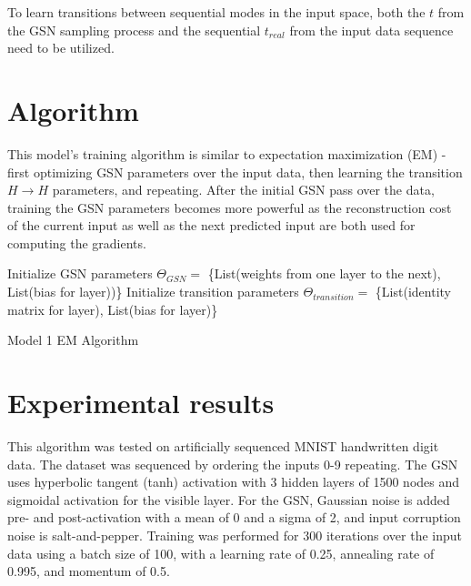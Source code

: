 To learn transitions between sequential modes in the input space, both  the \(t\) from the GSN sampling process and the sequential \(t_{real}\) from the input data sequence need to be utilized.


\section{Algorithm}

This model's training algorithm is similar to expectation maximization (EM) - first optimizing GSN parameters over the input data, then learning the transition \(H \rightarrow H\) parameters, and repeating. After the initial GSN pass over the data, training the GSN parameters becomes more powerful as the reconstruction cost of the current input as well as the next predicted input are both used for computing the gradients.

\begin{algorithm}[h!]
	Initialize GSN parameters \(\Theta_{GSN} = \) \{List(weights from one layer to the next), List(bias for layer))\}\;
	Initialize transition parameters \(\Theta_{transition}=\) \{List(identity matrix for layer), List(bias for layer)\} \;
	\caption{ Model 1 EM Algorithm }
\end{algorithm}

\section{Experimental results}

This algorithm was tested on artificially sequenced MNIST handwritten digit data. The dataset was sequenced by ordering the inputs 0-9 repeating. The GSN uses hyperbolic tangent (tanh) activation with 3 hidden layers of 1500 nodes and sigmoidal activation for the visible layer. For the GSN, Gaussian noise is added pre- and post-activation with a mean of 0 and a sigma of 2, and input corruption noise is salt-and-pepper. Training was performed for 300 iterations over the input data using a batch size of 100, with a learning rate of 0.25, annealing rate of 0.995, and momentum of 0.5.

